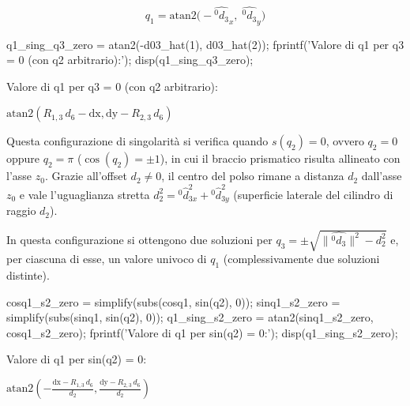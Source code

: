 \documentclass[11pt, a4paper]{article}
\begin{document}
\[
    q_1 = \textrm{atan2}\bigl(-{\hat{^{0}d_{3}}}_x, \;{\hat{^{0}d_{3}}}_y\bigr)
\]

\begin{matlabcode}
q1_sing_q3_zero = atan2(-d03_hat(1), d03_hat(2));
fprintf('Valore di q1 per q3 = 0 (con q2 arbitrario):');
disp(q1_sing_q3_zero);
\end{matlabcode}
\begin{matlaboutput}
Valore di q1 per q3 = 0 (con q2 arbitrario):
\end{matlaboutput}
\begin{matlabsymbolicoutput}
$\displaystyle \textrm{atan2}\left(R_{1,3} \,d_6 -\textrm{dx},\textrm{dy}-R_{2,3} \,d_6 \right)$
\end{matlabsymbolicoutput}


\begin{par}
\begin{flushleft}
Questa configurazione di singolarità si verifica quando $s(q_2 )=0$, ovvero $q_2 =0$ oppure $q_2 =\pi$ ($\cos (q_2 )=\pm 1$), in cui il braccio prismatico risulta allineato con l'asse $z_0$. Grazie all'offset $d_2 \not= 0$, il centro del polso rimane a distanza $d_2$ dall'asse $z_0$ e vale l'uguaglianza stretta $d_2^2 = {}^0\hat{d}_{3x}^2 + {}^0\hat{d}_{3y}^2$ (superficie laterale del cilindro di raggio $d_2$).
\end{flushleft}
\end{par}

\begin{par}
\begin{flushleft}
In questa configurazione si ottengono due soluzioni per $q_3 =\pm \sqrt{\|\hat{^0 d_3 } {\|}^2 -d_2^2 }$ e, per ciascuna di esse, un valore univoco di $q_1$ (complessivamente due soluzioni distinte).
\end{flushleft}
\end{par}

\begin{matlabcode}
cosq1_s2_zero = simplify(subs(cosq1, sin(q2), 0));
sinq1_s2_zero = simplify(subs(sinq1, sin(q2), 0));
q1_sing_s2_zero = atan2(sinq1_s2_zero, cosq1_s2_zero);
fprintf('Valore di q1 per sin(q2) = 0:');
disp(q1_sing_s2_zero);
\end{matlabcode}
\begin{matlaboutput}
Valore di q1 per sin(q2) = 0:
\end{matlaboutput}
\begin{matlabsymbolicoutput}
$\displaystyle \textrm{atan2}\left(-\frac{\textrm{dx}-R_{1,3} \,d_6 }{d_2 },\frac{\textrm{dy}-R_{2,3} \,d_6 }{d_2 }\right)$
\end{matlabsymbolicoutput}
\end{document}
